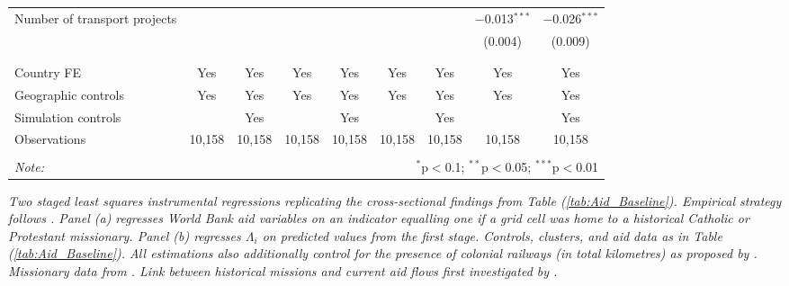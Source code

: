 \documentclass[11pt, oneside]{article}   	%
\let\oldref\ref
\renewcommand{\ref}[1]{(\oldref{#1})}
\newcommand{\mysubcaption}[1]{
\justify
\begin{spacing}{0.7}
\textit{\footnotesize #1}
\end{spacing}}
\begin{document}
\begin{table}[!h]
{\begin{tabular}{@{\extracolsep{5pt}}lcccccccc}
Number of transport projects &  &  &  &  &  &  & $-$0.013$^{***}$ & $-$0.026$^{***}$ \\
 &  &  &  &  &  &  & (0.004) & (0.009) \\
 & & & & & & & & \\
\hline \\[-1.8ex]
Country FE & Yes & Yes & Yes & Yes & Yes & Yes & Yes & Yes \\
Geographic controls & Yes & Yes & Yes & Yes & Yes & Yes & Yes & Yes \\
Simulation controls &  & Yes &  & Yes &  & Yes &  & Yes \\
Observations & 10,158 & 10,158 & 10,158 & 10,158 & 10,158 & 10,158 & 10,158 & 10,158 \\
 \hline
 \hline \\[-1.8ex]
 \textit{Note:}  & \multicolumn{8}{r}{$^{*}$p$<$0.1; $^{**}$p$<$0.05; $^{***}$p$<$0.01} \\
 \end{tabular}


}

\mysubcaption{Two staged least squares instrumental regressions replicating the cross-sectional findings from Table \ref{tab:Aid_Baseline}. Empirical strategy follows \cite{Castello-Climent_HigherEducationProsperity_2017}. Panel (a) regresses World Bank aid variables on an indicator equalling one if a grid cell was home to a historical Catholic or Protestant missionary. Panel (b) regresses $\Lambda_{i}$ on predicted values from the first stage. Controls, clusters, and aid data as in Table \ref{tab:Aid_Baseline}. All estimations also additionally control for the presence of colonial railways (in total kilometres) as proposed by \citeauthor{Castello-Climent_HigherEducationProsperity_2017}. Missionary data from \cite{Nunn_ReligiousConversionColonial_2010}. Link between historical missions and current aid flows first investigated by \cite{Alpino_LightingPathInfluence_2017}.}
\end{table}
\end{document}
